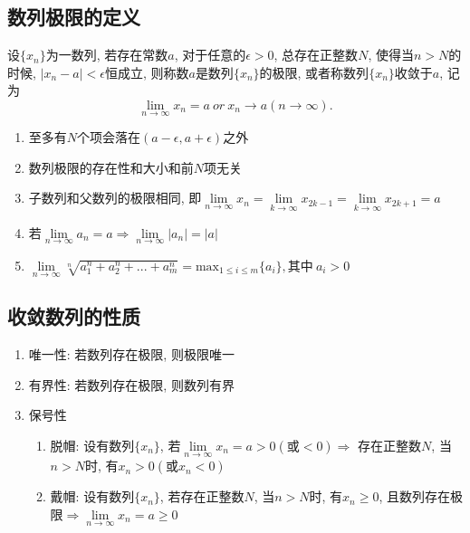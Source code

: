 \subsection{数列极限的定义}
设$ \{x_{n}\} $为一数列, 若存在常数$ a $, 对于任意的$ \epsilon >0 $, 总存在正整数$ N $, 使得当$ n>N $的时候, $ |x_{n}-a|<\epsilon $恒成立, 则称数$ a $是数列$ \{x_{n}\} $的极限, 或者称数列$ \{x_{n}\} $收敛于$ a $, 记为
\begin{equation*}
\lim_{n\rightarrow \infty} x_{n} = a\ or\ x_{n}\rightarrow a(n\rightarrow \infty).
\end{equation*}\par
\begin{tcolorbox}
\begin{enumerate}
\item 至多有$ N $个项会落在$ (a-\epsilon,a+\epsilon) $之外
\item 数列极限的存在性和大小和前$ N $项无关
\item 子数列和父数列的极限相同, 即$ \lim\limits_{n \rightarrow \infty}x_{n}=\lim\limits_{k \rightarrow \infty}x_{2k-1}=\lim\limits_{k \rightarrow \infty}x_{2k+1}=a $
\item 若$ \lim\limits_{n \rightarrow \infty}a_{n}=a\Rightarrow \lim\limits_{n \rightarrow \infty}|a_{n}|=|a| $
\item $ \lim\limits_{n \rightarrow \infty}\sqrt[n]{a_{1}^{n}+a_{2}^{n}+...+a_{m}^{n}}=\mathrm{max}_{1\le i\le m}\{a_{i}\}, \text{其中}\ a_{i}>0 $
\end{enumerate}
\end{tcolorbox}
\subsection{收敛数列的性质}
\begin{enumerate}
\item 唯一性: 若数列存在极限, 则极限唯一
\item 有界性: 若数列存在极限, 则数列有界
\item 保号性
\begin{enumerate}
\item 脱帽: 设有数列$ \{x_{n}\} $, 若$ \lim\limits_{n\rightarrow \infty}x_{n}=a>0(\text{或}<0)\Rightarrow $ 存在正整数$ N $, 当$ n>N $时, 有$ x_{n}>0(\text{或}x_{n}<0) $
\item 戴帽: 设有数列$ \{x_{n}\} $, 若存在正整数$ N $, 当$ n>N $时, 有$ x_{n}\ge 0 $, 且数列存在极限$ \Rightarrow \lim\limits_{n\rightarrow \infty}x_{n}=a\ge 0 $
\end{enumerate}
\end{enumerate}
